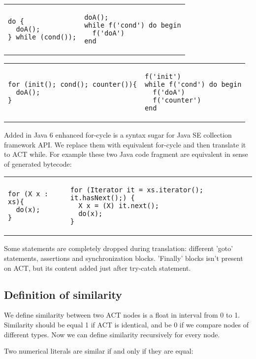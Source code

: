 \begin{tabular}{ p{6cm} p{6cm} }
\begin{verbatim}
do {
  doA();
} while (cond());
\end{verbatim} 
  & 
\begin{verbatim}
doA();
while f('cond') do begin
  f('doA')
end
\end{verbatim}
\end{tabular}

\begin{tabular}{ p{6cm} p{6cm} }
\begin{verbatim}
for (init(); cond(); counter()){
  doA();
}
\end{verbatim} 
  & 
\begin{verbatim}
f('init')
while f('cond') do begin
  f('doA')
  f('counter')
end
\end{verbatim}
\end{tabular}

Added in Java 6 enhanced for-cycle is a syntax sugar for Java SE collection framework API. We replace them
with equivalent for-cycle and then translate it to ACT while. For example these two Java code fragment are equivalent in
sense of generated bytecode:

\begin{tabular}{ p{6cm} p{6cm} }
\begin{verbatim}
for (X x : xs){
  do(x);
}
\end{verbatim} 
  & 
\begin{verbatim}
for (Iterator it = xs.iterator(); it.hasNext();) {
  X x = (X) it.next();
  do(x);    
}
\end{verbatim}
\end{tabular}

Some statements are completely dropped during translation: different 'goto' statements, assertions and synchronization
blocks. 'Finally' blocks isn't  present on ACT, but its content added just after try-catch statement.

\subsection{Definition of similarity}

We define similarity between two ACT nodes is a float in interval from 0 to 1.
Similarity should be equal 1 if ACT is identical, and be 0 if we compare nodes
of different types.
Now we can define similarity recursively for every node.

Two numerical literals are similar if and only if they are equal:


